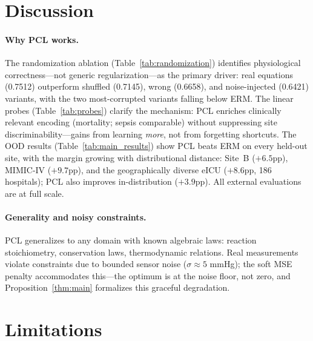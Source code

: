 \documentclass{article}
\begin{document}
\section{Discussion}
\label{sec:discussion}

\paragraph{Why PCL works.}
The randomization ablation (Table~\ref{tab:randomization}) identifies physiological correctness---not generic regularization---as the primary driver: real equations (0.7512) outperform shuffled (0.7145), wrong (0.6658), and noise-injected (0.6421) variants, with the two most-corrupted variants falling below ERM.
The linear probes (Table~\ref{tab:probes}) clarify the mechanism: PCL enriches clinically relevant encoding (mortality; sepsis comparable) without suppressing site discriminability---gains from learning \emph{more}, not from forgetting shortcuts.
The OOD results (Table~\ref{tab:main_results}) show PCL beats ERM on every held-out site, with the margin growing with distributional distance: Site~B ($+6.5$pp), MIMIC-IV ($+9.7$pp), and the geographically diverse eICU ($+8.6$pp, 186 hospitals); PCL also improves in-distribution ($+3.9$pp). All external evaluations are at full scale.

\paragraph{Generality and noisy constraints.}
PCL generalizes to any domain with known algebraic laws: reaction stoichiometry, conservation laws, thermodynamic relations.
Real measurements violate constraints due to bounded sensor noise ($\sigma \approx 5$ mmHg); the soft MSE penalty accommodates this---the optimum is at the noise floor, not zero, and Proposition~\ref{thm:main} formalizes this graceful degradation.

\section{Limitations}
\label{sec:limitations}
\end{document}
